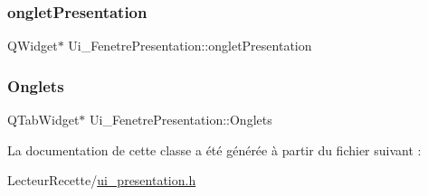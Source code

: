 \subsubsection{\texorpdfstring{onglet\+Presentation}{ongletPresentation}}
{\footnotesize\ttfamily Q\+Widget$\ast$ Ui\+\_\+\+Fenetre\+Presentation\+::onglet\+Presentation}

\mbox{\label{class_ui___fenetre_presentation_a5ada401c3f50deda8794ad915e047707}} 
\subsubsection{\texorpdfstring{Onglets}{Onglets}}
{\footnotesize\ttfamily Q\+Tab\+Widget$\ast$ Ui\+\_\+\+Fenetre\+Presentation\+::\+Onglets}



La documentation de cette classe a été générée à partir du fichier suivant \+:\begin{DoxyCompactItemize}
\item 
Lecteur\+Recette/\hyperlink{ui__presentation_8h}{ui\+\_\+presentation.\+h}\end{DoxyCompactItemize}
